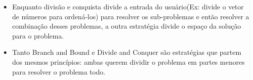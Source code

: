       \begin{itemize}
          \item Enquanto divisão e conquista divide a entrada do usuário(Ex: divide o vetor de 
          números para ordená-los) para resolver os sub-problemas e então resolver a combinação
          desses problemas, a outra estratégia divide o espaço da solução para o problema.
          \item Tanto Branch and Bound e Divide and Conquer são estratégias que partem dos 
          mesmos princípios: ambas querem dividir o problema em partes menores para resolver 
          o problema todo.
      \end{itemize}

    \nocite{divide-and-conquer}
    \nocite{closest-pair-of-points}
\newpage